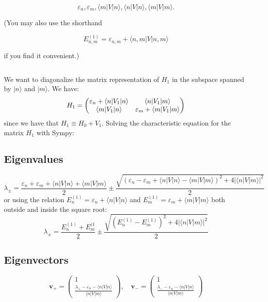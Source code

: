 \documentclass[12pt]{article}
\begin{document}
$$
\varepsilon_{n}, \varepsilon_{m},\langle m|V| n\rangle,\langle n|V| n\rangle,\langle m|V| m\rangle .
$$

(You may also use the shorthand

$$
E_{n, m}^{(1)}=\varepsilon_{n, m}+\langle n, m|V| n, m\rangle
$$

if you find it convenient.)
\subsection{}
We want to diagonalize the matrix representation of $H_{1}$ in the subspace spanned by $|n\rangle$ and $|m\rangle$. We have:
\begin{equation}
  H_{1}=\mqty(\varepsilon_{n}+\langle n|V_1| n\rangle & \langle n|V_1| m\rangle\\
  \langle m|V_1| n\rangle & \varepsilon_{m}+\langle m|V_1| m\rangle)
\end{equation}
since we have that $H_1 \equiv H_0 + V_1$.
Solving the characteristic equation for the matrix $H_1$ with Sympy:
\subsection*{Eigenvalues}

\[
\lambda_{\pm} = \frac{\varepsilon_{n} + \varepsilon_{m} + \langle n|V| n\rangle + \langle m|V| m\rangle}{2} \pm \frac{\sqrt{(\varepsilon_{n} - \varepsilon_{m} + \langle n|V| n\rangle - \langle m|V| m\rangle)^2 + 4|\langle n|V| m\rangle|^2}}{2}
\]
or using the relation $E_{n}^{(1)}=\varepsilon_{n}+\langle n|V| n\rangle$ and $E_{m}^{(1)}=\varepsilon_{m}+\langle m|V| m\rangle$ both outside and inside the square root:
\[
\lambda_{\pm} = \frac{E_{n}^{(1)} + E_{m}^{(1}}{2} \pm \frac{\sqrt{(E_{n}^{(1)} - E_{m}^{(1)})^2 + 4|\langle n|V| m\rangle|^2}}{2}
\]

\subsection*{Eigenvectors}

\[
\mathbf{v}_{+} = \begin{pmatrix} 1 \\ \frac{\lambda_{+} - \varepsilon_{n} - \langle n|V| n\rangle}{\langle n|V| m\rangle} \end{pmatrix}, \quad \mathbf{v}_{-} = \begin{pmatrix} 1 \\ \frac{\lambda_{-} - \varepsilon_{n} - \langle n|V| n\rangle}{\langle n|V| m\rangle} \end{pmatrix}
\]
\end{document}
